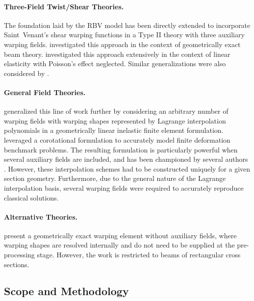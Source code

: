 \paragraph{Three-Field Twist/Shear Theories.}
The foundation laid by the RBV model has been directly extended to incorporate Saint~Venant's shear warping functions in a Type II theory with three auxiliary warping fields. 
\cite{klinkel2003anisotropic} investigated this approach in the context of geometrically exact beam theory. \cite{elfatmi2007nonuniform} investigated this approach extensively in the context of linear elasticity with Poisson's effect neglected. Similar generalizations were also considered by \cite{hjelmstad1987warping,kim2005exact}. 

\paragraph{General Field Theories.}
\cite{lecorvec2011enhanced} %
generalized this line of work further by considering an arbitrary number of warping fields with warping shapes represented by Lagrange interpolation polynomials in a geometrically linear inelastic finite element formulation. \cite{lecorvec2012nonlinear} leveraged a corotational formulation to accurately model finite deformation benchmark problems. 
The resulting formulation is particularly powerful when several auxiliary fields are included, and has been championed by several authors \citep{dire20173d,addessi2021enriched}. 
However, these interpolation schemes had to be constructed uniquely for a given section geometry.%
Furthermore, due to the general nature of the Lagrange interpolation basis, several warping fields were required to accurately reproduce classical solutions. 

\paragraph{Alternative Theories.}
\citet{wackerfuss2009mixed} present a geometrically exact warping element without auxiliary fields, where warping shapes are resolved internally and do not need to be supplied at the pre-processing stage. However, the work is restricted to beams of rectangular cross sections.

\subsection{Scope and Methodology}


